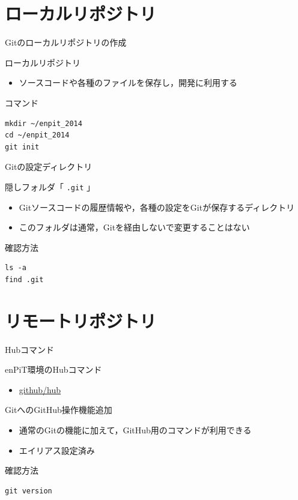 \documentclass[12pt, t, aspectratio=169]{beamer}
\begin{document}
\section{ローカルリポジトリ}
\label{sec-2-2}
\begin{frame}[fragile,label=sec-2-2-1]{Gitのローカルリポジトリの作成}
 \begin{block}{ローカルリポジトリ}
\begin{itemize}
\item ソースコードや各種のファイルを保存し，開発に利用する
\end{itemize}
\end{block}
\begin{block}{コマンド}
\begin{verbatim}
mkdir ~/enpit_2014
cd ~/enpit_2014
git init
\end{verbatim}
\end{block}
\end{frame}

\begin{frame}[fragile,label=sec-2-2-2]{Gitの設定ディレクトリ}
 \begin{block}{隠しフォルダ「 \texttt{.git} 」}
\begin{itemize}
\item Gitソースコードの履歴情報や，各種の設定をGitが保存するディレクトリ
\item このフォルダは通常，Gitを経由しないで変更することはない
\end{itemize}
\end{block}
\begin{block}{確認方法}
\begin{verbatim}
ls -a
find .git
\end{verbatim}
\end{block}
\end{frame}

\section{リモートリポジトリ}
\label{sec-2-3}
\begin{frame}[fragile,label=sec-2-3-1]{Hubコマンド}
 \begin{block}{enPiT環境のHubコマンド}
\begin{itemize}
\item \href{https://github.com/github/hub}{github/hub}
\end{itemize}
\end{block}
\begin{block}{GitへのGitHub操作機能追加}
\begin{itemize}
\item 通常のGitの機能に加えて，GitHub用のコマンドが利用できる
\item エイリアス設定済み
\end{itemize}
\end{block}
\begin{block}{確認方法}
\begin{verbatim}
git version
\end{verbatim}
\end{block}
\end{frame}
\end{document}
